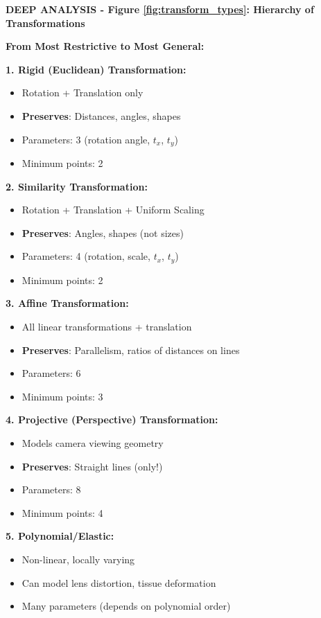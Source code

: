\documentclass[12pt,a4paper]{article}
\begin{document}
\begin{deepexplanation}
\textbf{DEEP ANALYSIS - Figure \ref{fig:transform_types}: Hierarchy of Transformations}

\textbf{From Most Restrictive to Most General:}

\textbf{1. Rigid (Euclidean) Transformation:}
\begin{itemize}
    \item Rotation + Translation only
    \item \textbf{Preserves}: Distances, angles, shapes
    \item Parameters: 3 (rotation angle, $t_x$, $t_y$)
    \item Minimum points: 2
\end{itemize}

\textbf{2. Similarity Transformation:}
\begin{itemize}
    \item Rotation + Translation + Uniform Scaling
    \item \textbf{Preserves}: Angles, shapes (not sizes)
    \item Parameters: 4 (rotation, scale, $t_x$, $t_y$)
    \item Minimum points: 2
\end{itemize}

\textbf{3. Affine Transformation:}
\begin{itemize}
    \item All linear transformations + translation
    \item \textbf{Preserves}: Parallelism, ratios of distances on lines
    \item Parameters: 6
    \item Minimum points: 3
\end{itemize}

\textbf{4. Projective (Perspective) Transformation:}
\begin{itemize}
    \item Models camera viewing geometry
    \item \textbf{Preserves}: Straight lines (only!)
    \item Parameters: 8
    \item Minimum points: 4
\end{itemize}

\textbf{5. Polynomial/Elastic:}
\begin{itemize}
    \item Non-linear, locally varying
    \item Can model lens distortion, tissue deformation
    \item Many parameters (depends on polynomial order)
\end{itemize}


\end{deepexplanation}
\end{document}
